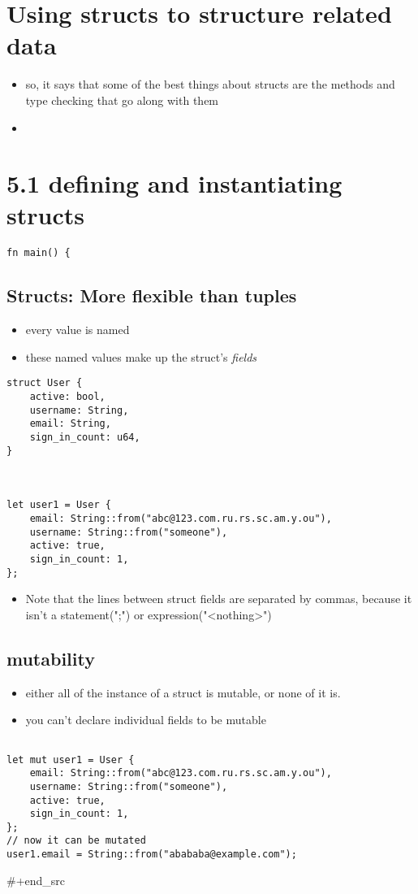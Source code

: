 \documentclass[11pt]{article}
\date{\today}
\title{}
\begin{document}
\tableofcontents

\section{Using structs to structure related data}
\label{sec:org10c879e}
\begin{itemize}
\item so, it says that some of the best things about structs are the methods and type checking that go along with them
\item 
\end{itemize}
\section{5.1 defining and instantiating structs}
\label{sec:orgbc42997}
\begin{verbatim}
fn main() {

\end{verbatim}

\subsection{Structs: More flexible than tuples}
\label{sec:org3b660d8}
\begin{itemize}
\item every value is named
\item these named values make up the struct's \emph{fields}
\end{itemize}

\begin{verbatim}
struct User {
    active: bool,
    username: String,
    email: String,
    sign_in_count: u64,
}



let user1 = User {
    email: String::from("abc@123.com.ru.rs.sc.am.y.ou"), 
    username: String::from("someone"),
    active: true,
    sign_in_count: 1,
};
\end{verbatim}
\begin{itemize}
\item Note that the lines between struct fields are separated by commas, because it isn't a statement(";") or expression("<nothing>")
\end{itemize}



\subsection{mutability}
\label{sec:orgd24cf06}
\begin{itemize}
\item either all of the instance of a struct is mutable, or none of it is.
\item you can't declare individual fields to be mutable
\end{itemize}
\begin{verbatim}

let mut user1 = User {
    email: String::from("abc@123.com.ru.rs.sc.am.y.ou"), 
    username: String::from("someone"),
    active: true,
    sign_in_count: 1,
};
// now it can be mutated
user1.email = String::from("abababa@example.com");
\end{verbatim}
\#+end\_src
\end{document}
